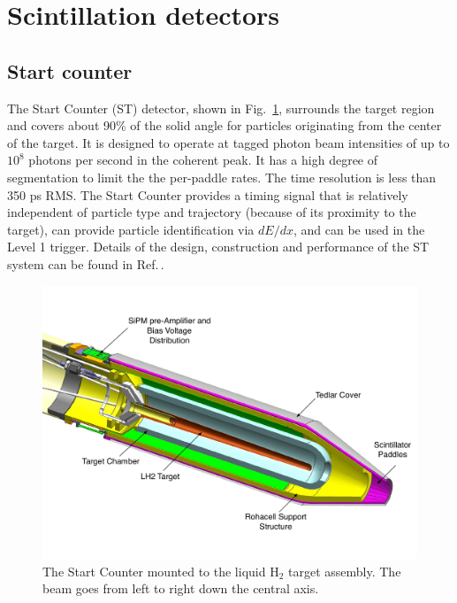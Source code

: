 \section[Scintillation detectors]{Scintillation detectors \label{sec:scintillators}}
\subsection{Start counter \label{sec:st}}

The Start Counter (ST) detector, shown in Fig.~\ref{fig:st-overview-drawing},
surrounds the target
region and covers about 90\% of the solid angle for particles
originating from the center of the target. It is designed to operate
at tagged photon beam intensities of up to $10^8$ photons per second
in the coherent peak. It has a high degree of segmentation to limit
the the per-paddle rates. The time resolution is less than 350 ps
RMS. The Start Counter provides a timing signal that is relatively
independent of particle type and trajectory (because of its proximity
to the target), can provide particle identification via $dE/dx$, and
can be used in the Level 1 trigger. Details of the design, construction and performance of the ST system can be found in 
Ref.\,\cite{Pooser:2019rhu}.

\begin{figure}[!htb]
\centering
\includegraphics[width=1.0\columnwidth]{figures/start_counter_all.pdf}
\caption{The \gx{} Start Counter mounted to the liquid $\mathrm{H_2}$
  target assembly.  The beam goes from left to right down the central
  axis.\label{fig:st-overview-drawing}}
\end{figure}

